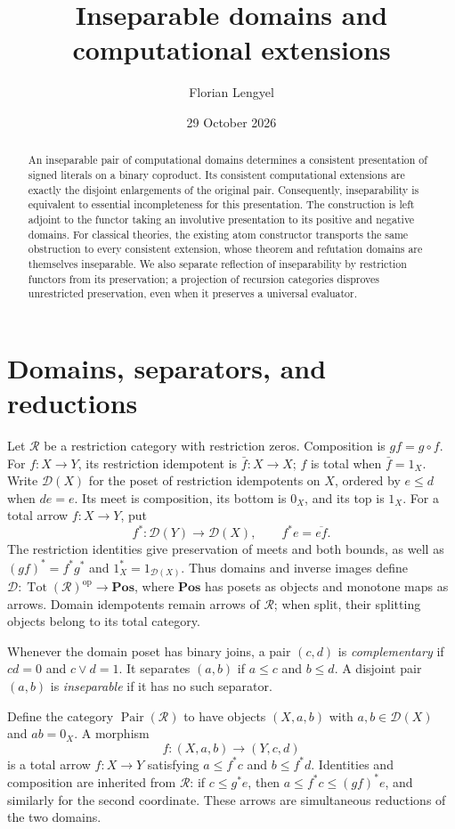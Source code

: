 \documentclass[11pt]{article}
\title{Inseparable domains and computational extensions}
\author{Florian Lengyel}
\date{29 October 2026}
\newcommand{\R}{\mathscr R}
\newcommand{\D}{\mathscr D}
\newcommand{\Pair}{\operatorname{Pair}}
\newcommand{\Tot}{\operatorname{Tot}}
\begin{document}
\maketitle
\begin{abstract}
An inseparable pair of computational domains determines a consistent
presentation of signed literals on a binary coproduct. Its consistent
computational extensions are exactly the disjoint enlargements of the
original pair. Consequently, inseparability is equivalent to essential
incompleteness for this presentation. The construction is left adjoint
to the functor taking an involutive presentation to its positive and
negative domains. For classical theories, the existing atom constructor
transports the same obstruction to every consistent extension, whose
theorem and refutation domains are themselves inseparable. We also
separate reflection of inseparability by restriction functors from its
preservation; a projection of recursion categories disproves unrestricted
preservation, even when it preserves a universal evaluator.
\end{abstract}

\section{Domains, separators, and reductions}

Let $\R$ be a restriction category with restriction zeros.
Composition is $gf=g\circ f$. For $f:X\to Y$, its restriction
idempotent is $\bar f:X\to X$; $f$ is total when $\bar f=1_X$.
Write $\D(X)$ for the poset of restriction idempotents on $X$,
ordered by $e\le d$ when $de=e$. Its meet is composition, its bottom
is $0_X$, and its top is $1_X$. For a total arrow $f:X\to Y$, put
\[
 f^*:\D(Y)\longrightarrow\D(X),\qquad f^*e=\overline{ef}.
\]
The restriction identities give preservation of meets and both bounds,
as well as $(gf)^*=f^*g^*$ and $1_X^*=1_{\D(X)}$.
Thus domains and inverse images define
$\D:\Tot(\R)^{\mathrm{op}}\to\mathbf{Pos}$, where
$\mathbf{Pos}$ has posets as objects and monotone maps as arrows.
Domain idempotents remain arrows of $\R$; when split,
their splitting objects belong to its total category.

Whenever the domain poset has binary joins, a pair $(c,d)$ is
\emph{complementary} if $cd=0$ and $c\vee d=1$.
It separates $(a,b)$ if $a\le c$ and $b\le d$.
A disjoint pair $(a,b)$ is \emph{inseparable} if it has no such
separator.

Define the category $\Pair(\R)$ to have objects $(X,a,b)$ with
$a,b\in\D(X)$ and $ab=0_X$. A morphism
\[
 f:(X,a,b)\longrightarrow(Y,c,d)
\]
is a total arrow $f:X\to Y$ satisfying $a\le f^*c$ and $b\le f^*d$.
Identities and composition are inherited from $\R$:
if $c\le g^*e$, then $a\le f^*c\le(gf)^*e$, and similarly for
the second coordinate. These arrows are simultaneous reductions of
the two domains.
\end{document}
